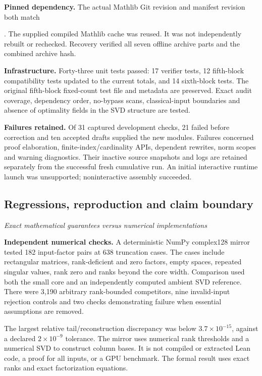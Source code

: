\textbf{Pinned dependency.} The actual Mathlib Git revision and manifest revision both match\par
{}.
The supplied compiled Mathlib cache was reused. It was not independently rebuilt or rechecked. Recovery verified all seven offline archive parts and the combined archive hash.

\textbf{Infrastructure.} Forty-three unit tests passed: 17 verifier tests, 12 fifth-block compatibility tests updated to the current totals, and 14 sixth-block tests. The original fifth-block fixed-count test file and metadata are preserved. Exact audit coverage, dependency order, no-bypass scans, classical-input boundaries and absence of optimality fields in the SVD structure are tested.

\textbf{Failures retained.} Of 31 captured development checks, 21 failed before correction and ten accepted drafts supplied the new modules. Failures concerned proof elaboration, finite-index/cardinality APIs, dependent rewrites, norm scopes and warning diagnostics. Their inactive source snapshots and logs are retained separately from the successful fresh cumulative run. An initial interactive runtime launch was unsupported; noninteractive assembly succeeded.



\subsection{Regressions, reproduction and claim boundary}\label{supp6:subsection:007}\textit{Exact mathematical guarantees versus numerical implementations}\par
\textbf{Independent numerical checks.} A deterministic NumPy complex128 mirror tested 182 input-factor pairs at 638 truncation cases. The cases include rectangular matrices, rank-deficient and zero factors, empty spaces, repeated singular values, rank zero and ranks beyond the core width. Comparison used both the small core and an independently computed ambient SVD reference. There were 3,190 arbitrary rank-bounded competitors, nine invalid-input rejection controls and two checks demonstrating failure when essential assumptions are removed.

The largest relative tail/reconstruction discrepancy was below $3.7\times10^{-15}$, against a declared $2\times10^{-9}$ tolerance. The mirror uses numerical rank thresholds and a numerical SVD to construct column bases. It is not compiled or extracted Lean code, a proof for all inputs, or a GPU benchmark. The formal result uses exact ranks and exact factorization equations.

